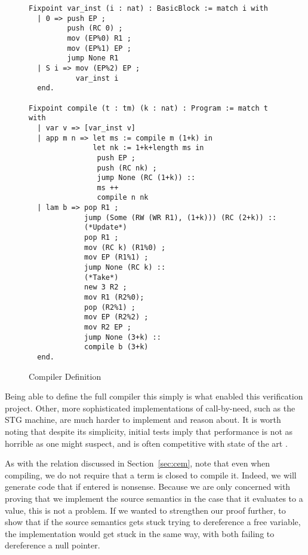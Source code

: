 \begin{figure}
\begin{lstlisting}
Fixpoint var_inst (i : nat) : BasicBlock := match i with
  | 0 => push EP ;
         push (RC 0) ;
         mov (EP%0) R1 ;
         mov (EP%1) EP ;
         jump None R1
  | S i => mov (EP%2) EP ;
           var_inst i
  end.

Fixpoint compile (t : tm) (k : nat) : Program := match t with
  | var v => [var_inst v]
  | app m n => let ms := compile m (1+k) in
               let nk := 1+k+length ms in
                push EP ;
                push (RC nk) ;
                jump None (RC (1+k)) ::
                ms ++
                compile n nk
  | lam b => pop R1 ;
             jump (Some (RW (WR R1), (1+k))) (RC (2+k)) ::
             (*Update*)
             pop R1 ;
             mov (RC k) (R1%0) ;
             mov EP (R1%1) ;
             jump None (RC k) ::
             (*Take*)
             new 3 R2 ;
             mov R1 (R2%0);
             pop (R2%1) ;
             mov EP (R2%2) ;
             mov R2 EP ;
             jump None (3+k) ::
             compile b (3+k)
  end. 
\end{lstlisting}
\caption{Compiler Definition}
\label{fig:compiler}
\end{figure}

Being able to define the full compiler this simply is what enabled this
verification project. Other, more sophisticated implementations of call-by-need,
such as the STG machine, are much harder to implement and reason about. It is
worth noting that despite its simplicity, initial tests imply that performance
is not as horrible as one might suspect, and is often competitive with state of
the art \cite{cem}.

As with the relation discussed in Section~\ref{sec:cem}, note that even when
compiling, we do not require that a term is closed to compile it. Indeed, we
will generate code that if entered is nonsense. Because we are only concerned
with proving that we implement the source semantics in the case that it
evaluates to a value, this is not a problem. If we wanted to strengthen our
proof further, to show that if the source semantics gets stuck trying to
dereference a free variable, the implementation would get stuck in the same way,
with both failing to dereference a null pointer.    
